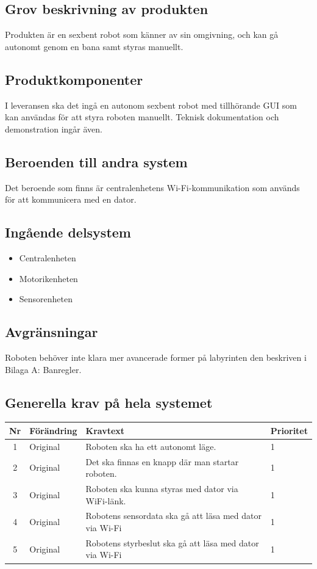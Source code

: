 \documentclass[a4paper,titlepage,12pt]{article}
\begin{document}
	\subsection{Grov beskrivning av produkten}
	Produkten är en sexbent robot som känner av sin omgivning, och kan gå autonomt
	genom en bana samt styras manuellt.
	\subsection{Produktkomponenter}
	I leveransen ska det ingå en autonom sexbent robot med tillhörande GUI som kan användas för att 
	styra roboten manuellt. Teknisk dokumentation och demonstration ingår även. 
	\subsection{Beroenden  till andra system}
	Det beroende som finns är centralenhetens Wi-Fi-kommunikation som används för 
	att kommunicera med en dator.
	\subsection{Ingående delsystem}
    \begin{itemize}
        \item Centralenheten
        \item Motorikenheten
        \item Sensorenheten
    \end{itemize}
	\subsection{Avgränsningar}
	Roboten behöver inte klara mer avancerade former på labyrinten den beskriven i Bilaga A: Banregler.
	\subsection{Generella krav på hela systemet}

	\begin{table}[h]
		\begin{tabularx}{\textwidth}{|c|l|X|l|}
		\hline
			\textbf{Nr} & \textbf{Förändring} & \textbf{Kravtext} & \textbf{Prioritet} 
				\\ \hline
	
			1 & Original & Roboten ska ha ett autonomt läge. & 1
					\\ \hline

			2 & Original & Det ska finnas en knapp där man startar roboten. & 1
				\\ \hline

			3 & Original & Roboten ska kunna styras med dator via WiFi-länk. & 1
				\\ \hline
		
			4 & Original & Robotens sensordata ska gå att läsa med dator via Wi-Fi & 1
				\\ \hline

			5 & Original & Robotens styrbeslut ska gå att läsa med dator via Wi-Fi & 1
				\\ \hline
		\end{tabularx}
	\end{table}
\end{document}
